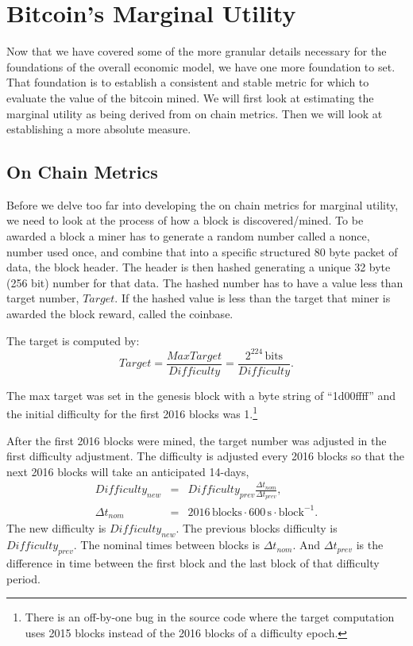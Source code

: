 \documentclass[runningheads]{llncs}
\begin{document}
\section{Bitcoin's Marginal Utility}
Now that we have covered some of the more granular details necessary for the foundations of the overall economic model, we have one more foundation to set.
That foundation is to establish a consistent and stable metric for which to evaluate the value of the bitcoin mined.
We will first look at estimating the marginal utility as being derived from on chain metrics.
Then we will look at establishing a more absolute measure.

\subsection{On Chain Metrics}
Before we delve too far into developing the on chain metrics for marginal utility, we need to look at the process of how a block is discovered/mined.
To be awarded a block a miner has to generate a random number called a nonce, number used once, and combine that into a specific structured 80 byte packet of data, the block header.
The header is then hashed generating a unique 32 byte (256 bit) number for that data.
The hashed number has to have a value less than target number, $Target$.
If the hashed value is less than the target that miner is awarded the block reward, called the coinbase.

The target is computed by:
\begin{equation}
    Target=\frac{MaxTarget}{Difficulty}=\frac{2^{224}\,\textrm{bits}}{Difficulty}. \label{eq:1}
\end{equation}

The max target was set in the genesis block with a byte string of ``1d00ffff'' and the initial difficulty for the first 2016 blocks was 1.\footnote{
    There is an off-by-one bug in the source code where the target computation uses 2015 blocks instead of the 2016 blocks of a difficulty epoch.}

After the first 2016 blocks were mined, the target number was adjusted in the first difficulty adjustment.
The difficulty is adjusted every 2016 blocks so that the next 2016 blocks will take an anticipated 14-days,
\begin{eqnarray}
    Difficulty_{new} & = & Difficulty_{prev}\frac{\Delta t_{nom}}{\Delta t_{prev}}, \label{eq:2} \\
    \Delta t_{nom}   & = & 2016 \,\textrm{blocks} \cdot 600\,\textrm{s} \cdot \textrm{block}^{-1}.
\end{eqnarray}
The new difficulty is $Difficulty_{new}$.
The previous blocks difficulty is $Difficulty_{prev}$.
The nominal times between blocks is $\Delta t_{nom}$.
And $\Delta t_{prev}$ is the difference in time between the first block and the last block of that difficulty period.
\end{document}
